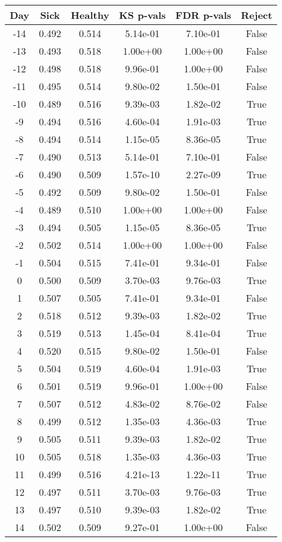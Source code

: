 \begin{tabular}{c|c|c|c|c|c}
Day &  Sick & Healthy &  KS p-vals & FDR p-vals & Reject\\
\hline
-14 & 0.492 &   0.514 &   5.14e-01 &   7.10e-01 &  False\\
-13 & 0.493 &   0.518 &   1.00e+00 &   1.00e+00 &  False\\
-12 & 0.498 &   0.518 &   9.96e-01 &   1.00e+00 &  False\\
-11 & 0.495 &   0.514 &   9.80e-02 &   1.50e-01 &  False\\
-10 & 0.489 &   0.516 &   9.39e-03 &   1.82e-02 &   True\\
 -9 & 0.494 &   0.516 &   4.60e-04 &   1.91e-03 &   True\\
 -8 & 0.494 &   0.514 &   1.15e-05 &   8.36e-05 &   True\\
 -7 & 0.490 &   0.513 &   5.14e-01 &   7.10e-01 &  False\\
 -6 & 0.490 &   0.509 &   1.57e-10 &   2.27e-09 &   True\\
 -5 & 0.492 &   0.509 &   9.80e-02 &   1.50e-01 &  False\\
 -4 & 0.489 &   0.510 &   1.00e+00 &   1.00e+00 &  False\\
 -3 & 0.494 &   0.505 &   1.15e-05 &   8.36e-05 &   True\\
 -2 & 0.502 &   0.514 &   1.00e+00 &   1.00e+00 &  False\\
 -1 & 0.504 &   0.515 &   7.41e-01 &   9.34e-01 &  False\\
  0 & 0.500 &   0.509 &   3.70e-03 &   9.76e-03 &   True\\
  1 & 0.507 &   0.505 &   7.41e-01 &   9.34e-01 &  False\\
  2 & 0.518 &   0.512 &   9.39e-03 &   1.82e-02 &   True\\
  3 & 0.519 &   0.513 &   1.45e-04 &   8.41e-04 &   True\\
  4 & 0.520 &   0.515 &   9.80e-02 &   1.50e-01 &  False\\
  5 & 0.504 &   0.519 &   4.60e-04 &   1.91e-03 &   True\\
  6 & 0.501 &   0.519 &   9.96e-01 &   1.00e+00 &  False\\
  7 & 0.507 &   0.512 &   4.83e-02 &   8.76e-02 &  False\\
  8 & 0.499 &   0.512 &   1.35e-03 &   4.36e-03 &   True\\
  9 & 0.505 &   0.511 &   9.39e-03 &   1.82e-02 &   True\\
 10 & 0.505 &   0.518 &   1.35e-03 &   4.36e-03 &   True\\
 11 & 0.499 &   0.516 &   4.21e-13 &   1.22e-11 &   True\\
 12 & 0.497 &   0.511 &   3.70e-03 &   9.76e-03 &   True\\
 13 & 0.497 &   0.510 &   9.39e-03 &   1.82e-02 &   True\\
 14 & 0.502 &   0.509 &   9.27e-01 &   1.00e+00 &  False\\
\end{tabular}